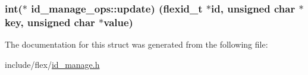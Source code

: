 \subsubsection[{\texorpdfstring{update}{update}}]{\setlength{\rightskip}{0pt plus 5cm}int($\ast$ id\+\_\+manage\+\_\+ops\+::update) ({\bf flexid\+\_\+t} $\ast$id, unsigned char $\ast$key, unsigned char $\ast$value)}\hypertarget{structid__manage__ops_a4a50cc4475967070b64333cfbc95b659}{}\label{structid__manage__ops_a4a50cc4475967070b64333cfbc95b659}


The documentation for this struct was generated from the following file\+:\begin{DoxyCompactItemize}
\item 
include/flex/\hyperlink{id__manage_8h}{id\+\_\+manage.\+h}\end{DoxyCompactItemize}
